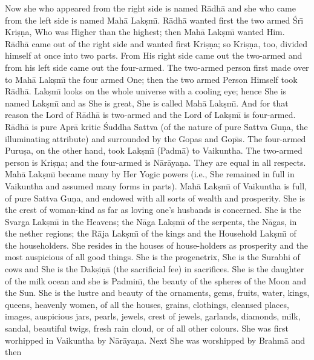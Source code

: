 Now she who appeared from the right side is named R\=adh\=a and she who came from the left side is named Mah\=a Lak\d{s}m\={\i}. R\=adh\=a wanted first the two armed \'Sr\={\i} Kri\d{s}\d{n}a, Who was Higher than the highest; then Mah\=a Lak\d{s}m\={\i} wanted Him. R\=adh\=a came out of the right side and wanted first Kri\d{s}\d{n}a; so Kri\d{s}\d{n}a, too, divided himself at once into two parts. From His right side came out the two-armed and from his left side came out the four-armed. The two-armed person first made over to Mah\=a Lak\d{s}m\={\i} the four armed One; then the two armed Person Himself took R\=adh\=a. Lak\d{s}m\={\i} looks on the whole universe with a cooling eye; hence She is named Lak\d{s}m\={\i} and as She is great, She is called Mah\=a Lak\d{s}m\={\i}. And for that reason the Lord of R\=adh\=a is two-armed and the Lord of Lak\d{s}m\={\i} is four-armed. R\=adh\=a is pure Apr\=a kritic \'Suddha Sattva (of the nature of pure Sattva Gu\d{n}a, the illuminating attribute) and surrounded by the Gopas and Gop\={\i}s. The four-armed Puru\d{s}a, on the other hand, took Lak\d{s}m\={\i} (Padm\=a) to Vaikuntha. The two-armed person is Kri\d{s}\d{n}a; and the four-armed is N\=ar\=aya\d{n}a. They are equal in all respects. Mah\=a Lak\d{s}m\={\i} became many by Her Yogic powers (i.e., She remained in full in Vaikuntha and assumed many forms in parts). Mah\=a Lak\d{s}m\={\i} of Vaikuntha is full, of pure Sattva Gu\d{n}a, and endowed with all sorts of wealth and prosperity. She is the crest of woman-kind as far as loving one's husbands is concerned. She is the Svarga Lak\d{s}m\={\i} in the Heavens; the N\=aga Lak\d{s}m\={\i} of the serpents, the N\=agas, in the nether regions; the R\=aja Lak\d{s}m\={\i} of the kings and the Household Lak\d{s}m\={\i} of the householders. She resides in the houses of house-holders as prosperity and the most auspicious of all good things. She is the progenetrix, She is the Surabhi of cows and She is the Dak\d{s}i\d{n}\=a (the sacrificial fee) in sacrifices. She is the daughter of the milk ocean and she is Padmin\={\i}, the beauty of the spheres of the Moon and the Sun. She is the lustre and beauty of the ornaments, gems, fruits, water, kings, queens, heavenly women, of all the houses, grains, clothings, cleansed places, images, auspicious jars, pearls, jewels, crest of jewels, garlands, diamonds, milk, sandal, beautiful twigs, fresh rain cloud, or of all other colours. She was first worhipped in Vaikuntha by N\=ar\=aya\d{n}a. Next She was worshipped by Brahm\=a and then

